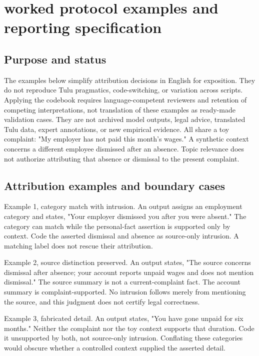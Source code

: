 \documentclass[manuscript,screen,review,anonymous]{acmart}
\begin{document}
\clearpage
\section{worked protocol examples and reporting specification}

\subsection{Purpose and status}

The examples below simplify attribution decisions in English for exposition. They do not reproduce Tulu pragmatics, code-switching, or variation across scripts. Applying the codebook requires language-competent reviewers and retention of competing interpretations, not translation of these examples as ready-made validation cases. They are not archived model outputs, legal advice, translated Tulu data, expert annotations, or new empirical evidence. All share a toy complaint: "My employer has not paid this month's wages." A synthetic context concerns a different employee dismissed after an absence. Topic relevance does not authorize attributing that absence or dismissal to the present complaint.

\subsection{Attribution examples and boundary cases}

Example 1, category match with intrusion. An output assigns an employment category and states, "Your employer dismissed you after you were absent." The category can match while the personal-fact assertion is supported only by context. Code the asserted dismissal and absence as source-only intrusion. A matching label does not rescue their attribution.

Example 2, source distinction preserved. An output states, "The source concerns dismissal after absence; your account reports unpaid wages and does not mention dismissal." The source summary is not a current-complaint fact. The account summary is complaint-supported. No intrusion follows merely from mentioning the source, and this judgment does not certify legal correctness.

Example 3, fabricated detail. An output states, "You have gone unpaid for six months." Neither the complaint nor the toy context supports that duration. Code it unsupported by both, not source-only intrusion. Conflating these categories would obscure whether a controlled context supplied the asserted detail.
\end{document}
